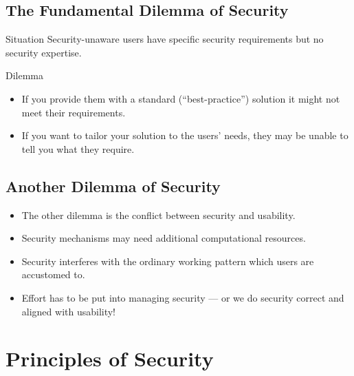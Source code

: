 \documentclass{beamer}
\begin{document}
\subsection{The Fundamental Dilemma of Security}

\begin{frame}
  \begin{block}{Situation}
    Security-unaware users have specific security requirements but no security 
    expertise.
  \end{block}

  \begin{block}{Dilemma}
    \begin{itemize}
      \item If you provide them with a standard (\enquote{best-practice}) 
        solution it might not meet their requirements.

      \item If you want to tailor your solution to the users' needs, they may 
        be unable to tell you what they require.

    \end{itemize}
  \end{block}
\end{frame}

\subsection{Another Dilemma of Security}

\begin{frame}
  \begin{itemize}
    \item The other dilemma is the conflict between security and 
      usability.
      
    \item Security mechanisms may need additional computational resources.

    \item Security interferes with the ordinary working pattern which users are 
      accustomed to.

    \item Effort has to be put into managing security --- or we do security 
      correct and aligned with usability!
  \end{itemize}
\end{frame}


\section{Principles of Security}
\end{document}

